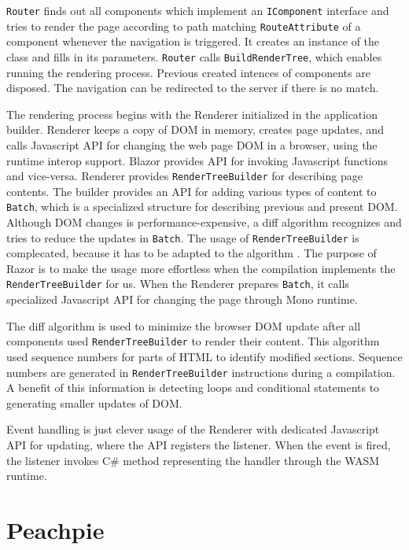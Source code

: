 \texttt{Router} finds out all components which implement an \texttt{IComponent} interface and tries to render the page according to path matching \texttt{RouteAttribute} of a component whenever the navigation is triggered.
It creates an instance of the class and fills in its parameters.
\texttt{Router} calls \texttt{BuildRenderTree}, which enables running the rendering process.
Previous created intences of components are disposed.
The navigation can be redirected to the server if there is no match.
\par
The rendering process begins with the Renderer initialized in the application builder.
Renderer keeps a copy of DOM in memory, creates page updates, and calls Javascript API for changing the web page DOM in a browser, using the runtime interop support.
Blazor provides API for invoking Javascript functions and vice-versa.
Renderer provides \texttt{RenderTreeBuilder} for describing page contents.
The builder provides an API for adding various types of content to \texttt{Batch}, which is a specialized structure for describing previous and present DOM.
Although DOM changes is performance-expensive, a diff algorithm  recognizes and tries to reduce the updates in \texttt{Batch}.
The usage of \texttt{RenderTreeBuilder} is complecated, because it has to be adapted to the algorithm .
The purpose of Razor is to make the usage more effortless when the compilation implements the \texttt{RenderTreeBuilder} for us.
When the Renderer prepares \texttt{Batch}, it calls specialized Javascript API for changing the page through Mono runtime.
\par
The diff algorithm is used to minimize the browser DOM  update after all components used \texttt{RenderTreeBuilder} to render their content.
This algorithm used sequence numbers for parts of HTML to identify modified sections.
Sequence numbers are generated in \texttt{RenderTreeBuilder} instructions during a compilation.
A benefit of this information is detecting loops and conditional statements to generating smaller updates of DOM.  
\par
Event handling is just clever usage of the Renderer with dedicated Javascript API for updating, where the API registers the listener.
When the event is fired, the listener invokes C\# method representing the handler through the WASM runtime.

\section{Peachpie}

